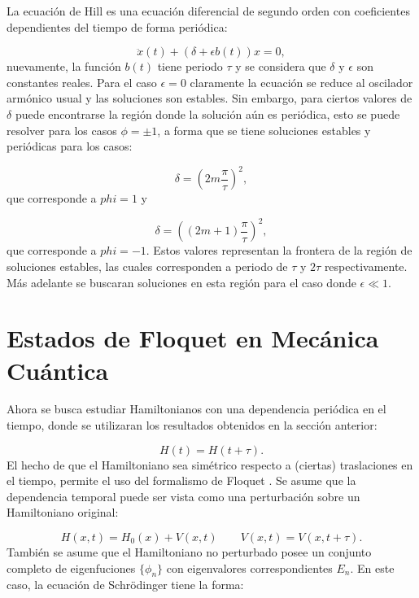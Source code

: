 \documentclass[a4paper,10pt]{report}
\begin{document}
La ecuación de Hill es una ecuación diferencial de segundo orden con coeficientes dependientes del tiempo de forma periódica\cite{WardFT}:

\begin{equation}
\ddot{x}(t) + (\delta + \epsilon b(t))x = 0,
\end{equation} nuevamente, la función $b(t)$ tiene periodo $\tau$ y se considera que $\delta$ y $\epsilon$ son constantes reales. Para el caso $\epsilon = 0$ claramente la ecuación se reduce al oscilador armónico usual y las soluciones son estables. Sin embargo, para ciertos valores de $\delta$ puede encontrarse la región donde la solución aún es periódica, esto se puede resolver para los casos $\phi = \pm 1$, a forma que se tiene soluciones estables y periódicas para los casos:

\begin{equation}
\delta = (2m\frac{\pi}{\tau})^2, 
\end{equation} que corresponde a $phi=1$ y

\begin{equation}
\delta = ((2m+1)\frac{\pi}{\tau})^2,
\end{equation} que corresponde a $phi=-1$. Estos valores representan la frontera de la región de soluciones estables, las cuales corresponden a periodo de $\tau$ y $2\tau$ respectivamente. Más adelante se buscaran soluciones en esta región para el caso donde $\epsilon \ll 1$.


\section{Estados de Floquet en Mecánica Cuántica}

Ahora se busca estudiar Hamiltonianos con una dependencia periódica en el tiempo, donde se utilizaran los resultados obtenidos en la sección anterior:

\begin{equation}
H(t)=H(t+\tau).
\end{equation} El hecho de que el Hamiltoniano sea simétrico respecto a (ciertas) traslaciones en el tiempo, permite el uso del formalismo de Floquet \cite{HanngiDQS}. Se asume que la dependencia temporal puede ser vista como una perturbación sobre un Hamiltoniano original:

\begin{equation}
H(x,t)=H_0(x)+V(x,t) \qquad V(x,t)=V(x,t+\tau).
\end{equation} También se asume que el Hamiltoniano no perturbado posee un conjunto completo de eigenfuciones $\{\phi_n\}$ con eigenvalores correspondientes $E_n$. En este caso, la ecuación de Schr\"{o}dinger tiene la forma:
\end{document}
